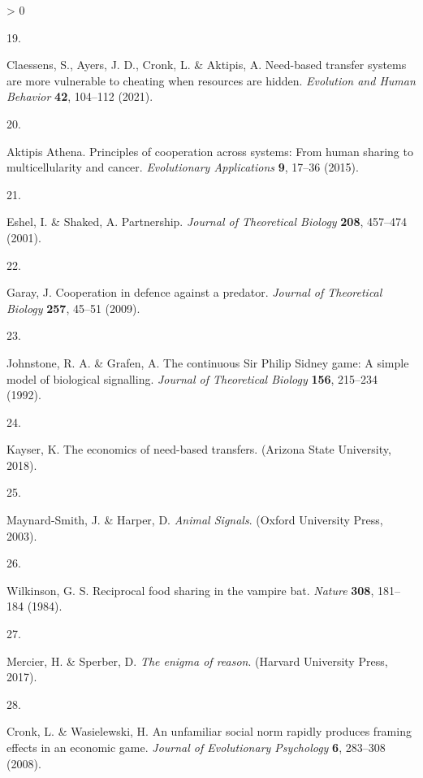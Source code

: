 \documentclass[
]{article}
\newlength{\cslhangindent}
\newlength{\csllabelwidth}
\newenvironment{CSLReferences}[2] %
 {%
  \setlength{\parindent}{0pt}
  \ifodd #1 \everypar{\setlength{\hangindent}{\cslhangindent}}\ignorespaces\fi
  \ifnum #2 > 0
  \setlength{\parskip}{#2\baselineskip}
  \fi
 }%
 {}
\newcommand{\CSLLeftMargin}[1]{\parbox[t]{\csllabelwidth}{#1}}
\newcommand{\CSLRightInline}[1]{\parbox[t]{\linewidth - \csllabelwidth}{#1}\break}
\begin{document}
\begin{CSLReferences}{0}{0}
\leavevmode\hypertarget{ref-claessensNeedbasedTransferSystems2021}{}%
\CSLLeftMargin{19. }
\CSLRightInline{Claessens, S., Ayers, J. D., Cronk, L. \& Aktipis, A. Need-based transfer systems are more vulnerable to cheating when resources are hidden. \emph{Evolution and Human Behavior} \textbf{42}, 104--112 (2021).}

\leavevmode\hypertarget{ref-aktipisathenaPrinciplesCooperationSystems2015}{}%
\CSLLeftMargin{20. }
\CSLRightInline{Aktipis Athena. Principles of cooperation across systems: From human sharing to multicellularity and cancer. \emph{Evolutionary Applications} \textbf{9}, 17--36 (2015).}

\leavevmode\hypertarget{ref-eshelPartnership2001}{}%
\CSLLeftMargin{21. }
\CSLRightInline{Eshel, I. \& Shaked, A. Partnership. \emph{Journal of Theoretical Biology} \textbf{208}, 457--474 (2001).}

\leavevmode\hypertarget{ref-garayCooperationDefencePredator2009}{}%
\CSLLeftMargin{22. }
\CSLRightInline{Garay, J. Cooperation in defence against a predator. \emph{Journal of Theoretical Biology} \textbf{257}, 45--51 (2009).}

\leavevmode\hypertarget{ref-johnstoneContinuousSirPhilip1992}{}%
\CSLLeftMargin{23. }
\CSLRightInline{Johnstone, R. A. \& Grafen, A. The continuous {Sir Philip Sidney} game: {A} simple model of biological signalling. \emph{Journal of Theoretical Biology} \textbf{156}, 215--234 (1992).}

\leavevmode\hypertarget{ref-kayserEconomicsNeedbasedTransfers2018}{}%
\CSLLeftMargin{24. }
\CSLRightInline{Kayser, K. The economics of need-based transfers. (Arizona State University, 2018).}

\leavevmode\hypertarget{ref-maynard-smithAnimalSignals2003}{}%
\CSLLeftMargin{25. }
\CSLRightInline{Maynard-Smith, J. \& Harper, D. \emph{Animal {Signals}}. ({Oxford University Press}, 2003).}

\leavevmode\hypertarget{ref-wilkinsonReciprocalFoodSharing1984}{}%
\CSLLeftMargin{26. }
\CSLRightInline{Wilkinson, G. S. Reciprocal food sharing in the vampire bat. \emph{Nature} \textbf{308}, 181--184 (1984).}

\leavevmode\hypertarget{ref-mercierEnigmaReason2017}{}%
\CSLLeftMargin{27. }
\CSLRightInline{Mercier, H. \& Sperber, D. \emph{The enigma of reason}. ({Harvard University Press}, 2017).}

\leavevmode\hypertarget{ref-cronkUnfamiliarSocialNorm2008}{}%
\CSLLeftMargin{28. }
\CSLRightInline{Cronk, L. \& Wasielewski, H. An unfamiliar social norm rapidly produces framing effects in an economic game. \emph{Journal of Evolutionary Psychology} \textbf{6}, 283--308 (2008).}


\end{CSLReferences}
\end{document}
